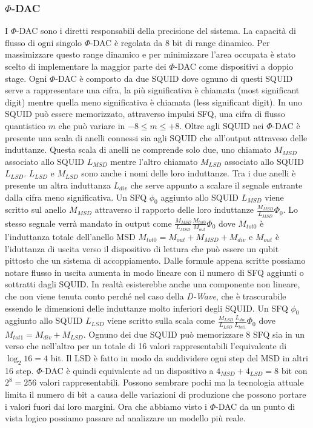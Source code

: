 \subsubsection{$\Phi$-DAC}
I $\Phi$-DAC sono i diretti responsabili della precisione del sistema. La capacità di flusso di ogni singolo $\Phi$-DAC è regolata da 8 bit di range dinamico. Per massimizzare questo range dinamico e per minimizzare l'area occupata è stato scelto di implementare la maggior parte dei $\Phi$-DAC come dispositivi a doppio stage. Ogni $\Phi$-DAC è composto da due SQUID dove ognuno di questi SQUID serve a rappresentare una cifra, la più significativa è chiamata  (most significant digit) mentre quella meno significativa è chiamata  (less significant digit). In uno SQUID può essere memorizzato, attraverso impulsi SFQ, una cifra di flusso quantistico $m$ che può variare in $-8 \le m \le +8$. Oltre agli SQUID nei $\Phi$-DAC è presente una scala di anelli connessi sia agli SQUID che all'output attraveso delle induttanze. Questa scala di anelli ne comprende solo due, uno chiamato $M_{MSD}$ associato allo SQUID $L_{MSD}$ mentre l'altro chiamato $M_{LSD}$ associato allo SQUID $L_{LSD}$. $L_{LSD}$ e $M_{LSD}$ sono anche i nomi delle loro induttanze.
Tra i due anelli è presente un altra induttanza $L_{div}$ che serve appunto a scalare il segnale entrante dalla cifra meno significativa. Un SFQ $\phi_0$ aggiunto allo SQUID $L_{MSD}$ viene scritto sul anello $M_{MSD}$ attraverso il rapporto delle loro induttanze $\frac{M_{MSD}}{L_{MSD}}\Phi_0$.
Lo stesso segnale verrà mandato in output come $\frac{M_{MSD}}{L_{MSD}}\frac{M_{tot0}}{M_{out}}\Phi_0$ dove $M_{tot0}$ è l'induttanza totale dell'anello MSD $M_{tot0} = M_{out} + M_{MSD} + M_{div}$ e $M_{out}$ è l'iduttanza di uscita verso il dispositivo di lettura che può essere un qubit pittosto che un sistema di accoppiamento. Dalle formule appena scritte possiamo notare flusso in uscita aumenta in modo lineare con il numero di SFQ aggiunti o sottratti dagli SQUID. In realtà esisterebbe anche una componente non lineare, che non viene tenuta conto perché nel caso della \textit{D-Wave}, che è trascurabile essendo le dimensioni delle induttanze molto inferiori degli SQUID.
Un SFQ $\phi_0$ aggiunto allo SQUID $L_{LSD}$ viene scritto sulla scala come $\frac{M_{LSD}}{L_{LSD}}\frac{L_{div}}{L_{tot1}}\Phi_0$ dove $M_{tot1} = M_{div} + M_{LSD}$. Ognuno dei due SQUID può memorizzare 8 SFQ sia in un verso che nell'altro per un totale di 16 valori rappresentabili l'equivalente di $\log_2{16} = 4$ bit. Il LSD è fatto in modo da suddividere ogni step del MSD in altri 16 step. $\Phi$-DAC è quindi equivalente ad un dispositivo a $4_{MSD} + 4_{LSD} = 8$ bit con $2^8 = 256$ valori rappresentabili.
Possono sembrare pochi ma la tecnologia attuale limita il numero di bit a causa delle variazioni di produzione che possono portare i valori fuori dai loro margini.
Ora che abbiamo visto i $\Phi$-DAC da un punto di vista logico possiamo passare ad analizzare un modello più reale.
